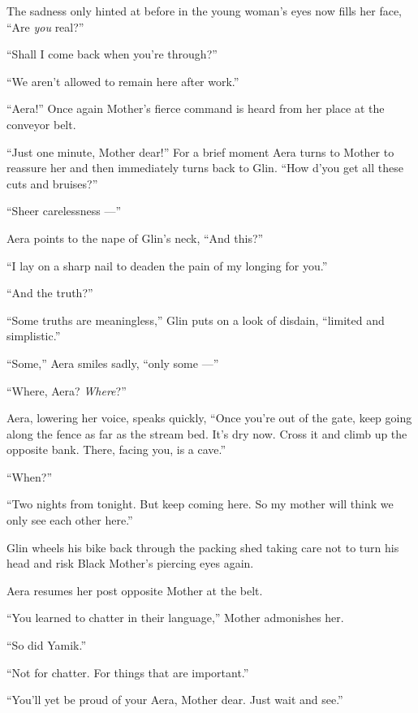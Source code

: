 \documentclass[twoside,11pt,openany]{book}
\begin{document}
The sadness only hinted at before in the young woman's eyes now fills her face, ``Are \textit{you}
real?''

``Shall I come back when you're through?''

``We aren't allowed to remain here after work.''

``Aera!'' Once again Mother's fierce command is heard from her place at the conveyor belt.

``Just one minute, Mother dear!'' For a brief moment\MakeUppercase{ a}era turns to Mother to
reassure her and then immediately turns back to Glin. ``How d'you get all these cuts and
bruises?''

``Sheer carelessness ---''

Aera points to the nape of Glin's neck, ``And this?''

``I lay on a sharp nail to deaden the pain of my longing for you.''

``And the truth?''

``Some truths are meaningless,'' Glin puts on a look of disdain, ``limited and
simplistic.''

``Some,'' Aera smiles sadly, ``only some ---''

``Where, Aera? \textit{Where}?''

Aera, lowering her voice, speaks quickly, ``Once you're out of the gate, keep going along the fence as far
as the stream bed. It's dry now. Cross it and climb up the opposite bank. There, facing you, is a
cave.''

``When?''

``Two nights from tonight. But keep coming here. So my mother will think we only see each other
here.''

Glin wheels his bike back through the packing shed taking care not to turn his head and risk Black Mother's piercing
eyes again.

Aera resumes her post opposite Mother at the belt.

``You learned to chatter in their language,'' Mother admonishes her.

``So did Yamik.''

``Not for chatter. For things that are important.''

``You'll yet be proud of your Aera, Mother dear.  Just wait and see.''



\chapter{}
\end{document}
